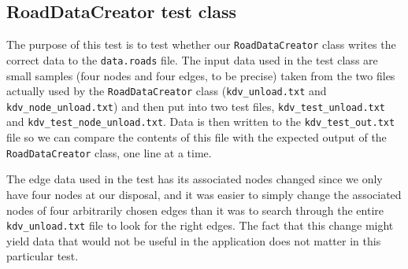 \subsection{RoadDataCreator test class}
The purpose of this test is to test whether our \texttt{RoadDataCreator} class writes the correct data to the \texttt{data.roads} file. The input data used in the test class are small samples (four nodes and four edges, to be precise) taken from the two files actually used by the \texttt{RoadDataCreator} class (\texttt{kdv_unload.txt} and \texttt{kdv_node_unload.txt}) and then put into two test files, \texttt{kdv_test_unload.txt} and \texttt{kdv_test_node_unload.txt}. Data is then written to the \texttt{kdv_test_out.txt} file so we can compare the contents of this file with the expected output of the \texttt{RoadDataCreator} class, one line at a time.

The edge data used in the test has its associated nodes changed since we only have four nodes at our disposal, and it was easier to simply change the associated nodes of four arbitrarily chosen edges than it was to search through the entire \texttt{kdv_unload.txt} file to look for the right edges. The fact that this change might yield data that would not be useful in the application does not matter in this particular test.
